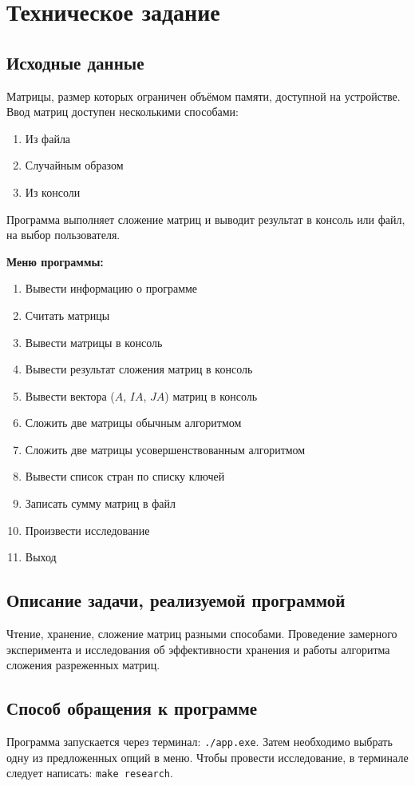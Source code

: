 \section{Техническое задание}

	\subsection{Исходные данные}
	Матрицы, размер которых ограничен объёмом памяти, доступной на устройстве. Ввод матриц доступен несколькими способами: 
	\begin{enumerate}
		\item Из файла
		\item Случайным образом 
		\item Из консоли
	\end{enumerate}
	Программа выполняет сложение матриц и выводит результат в консоль или файл, на выбор пользователя.\par
	
	\noindent\textbf{Меню программы:}
	\begin{enumerate}
		\item Вывести информацию о программе
		\item Считать матрицы
		\item Вывести матрицы в консоль
		\item Вывести результат сложения матриц в консоль
		\item Вывести вектора ($A$, $IA$, $JA$) матриц в консоль
		\item Сложить две матрицы обычным алгоритмом
		\item Сложить две матрицы усовершенствованным алгоритмом
		\item Вывести список стран по списку ключей
		\item Записать сумму матриц в файл
		\item Произвести исследование
		\item Выход
	\end{enumerate}
	
	\subsection{Описание задачи, реализуемой программой}
	Чтение, хранение, сложение матриц разными способами. Проведение замерного эксперимента и исследования об эффективности хранения и работы алгоритма сложения разреженных матриц.
	
	\subsection{Способ обращения к программе}
	Программа запускается через терминал: \texttt{./app.exe}. Затем необходимо выбрать одну из предложенных опций в меню. Чтобы провести исследование, в терминале следует написать: \texttt{make research}.

